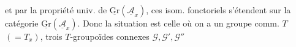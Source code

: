 et par la propriété univ. de $\underline{\mathrm{Gr}}(\underline{\mathcal{A}}_x)$,
ces isom. fonctoriels s'étendent sur la catégorie
$\underline{\mathrm{Gr}}(\underline{\mathcal{A}}_x)$.
Donc la situation est celle où on a un groupe comm. $T$ $(=T_x)$,
trois $T$-groupoïdes connexes $\mathcal{G},\mathcal{G}',\mathcal{G}''$




